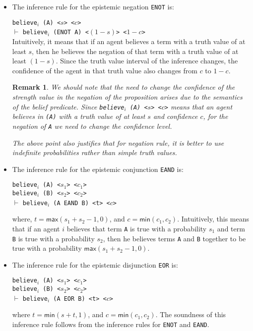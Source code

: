 \documentclass[12pt]{article}
\newtheorem{remark}[theorem]{Remark}
\begin{document}
\begin{itemize}
\item
\noindent The inference rule for the epistemic negation \texttt{ENOT} is:  

\noindent \texttt{believe$_i$ (A) <$s$> <$c$>} \\
 $\vdash$
\texttt{believe$_i$ (ENOT A) <$(1-s)$> <$1-c$>} \\

\noindent Intuitively, it means that if an agent believes a term with a truth value of at least $s$, then he believes the negation of that term with a truth value of at least $(1-s)$. Since the truth value interval of the inference changes, the confidence of the agent in that truth value also changes from $c$ to $1-c$. 

\begin{remark}{\em 
We should note that the need to change the confidence of the strength value in the negation of the proposition arises due to the semantics of the belief predicate. Since \texttt{believe$_i$ (A) <$s$> <$c$>} means that an agent believes in \texttt{(A)} with a truth value of at least $s$ and confidence $c$, for the negation of \texttt{A} we need to change the confidence level.

The above point also justifies that for negation rule, it is better to use indefinite probabilities rather than simple truth values.}


\end{remark}
\item  \noindent The inference rule for the epistemic conjunction \texttt{EAND} is: 

\noindent \texttt{believe$_i$ (A) <$s_1$> <$c_1$>}\\
 \texttt{believe$_i$ (B) <$s_2$> <$c_2$>}\\
 $\vdash$
\texttt{believe$_i$ (A EAND B) <t> <$c$>}  

where, $t = \mathsf{max}(s_1+s_2-1,0)$, and $c=\mathsf{min}(c_1,c_2)$. Intuitively, this means that if an agent $i$ believes that term \texttt{A} is true with a probability $s_1$ and term \texttt{B} is true with a probability $s_2$, then he believes terms \texttt{A} and \texttt{B} together to be true with a probability $\mathsf{max}(s_1+s_2-1,0)$.



 \item \noindent The inference rule for the epistemic disjunction \texttt{EOR} is: 

\noindent \texttt{believe$_i$ (A) <$s_1$> <$c_1$>}\\
 \texttt{believe$_i$ (B) <$s_2$> <$c_2$>}\\
 $\vdash$
\texttt{believe$_i$ (A EOR B) <t> <$c$>}

where $t = \mathsf{min}(s+t,1)$, and $c=\mathsf{min}(c_1,c_2)$. The soundness of this inference rule follows from the inference rules for \texttt{ENOT} and \texttt{EAND}.

 
\end{itemize}
\end{document}
